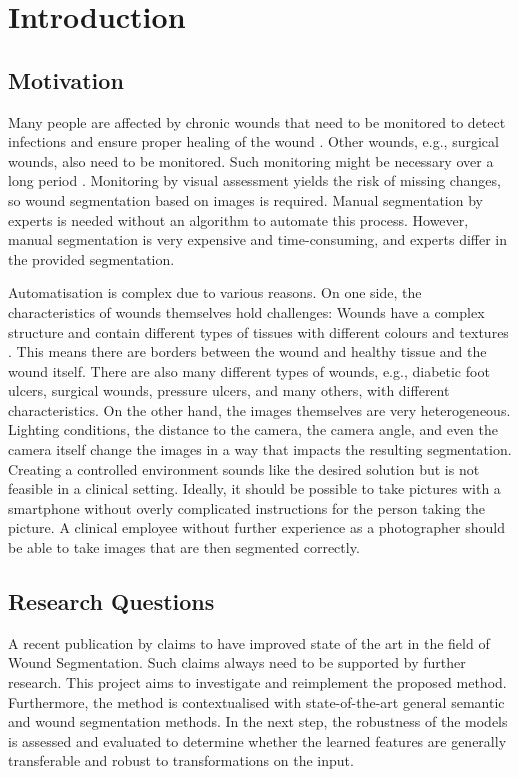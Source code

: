 \section{Introduction}

\subsection{Motivation}

Many people are affected by chronic wounds that need to be monitored to detect infections and ensure proper healing of the wound \cite{DFUC2022}. Other wounds, e.g., surgical wounds, also need to be monitored. Such monitoring might be necessary over a long period \cite{DFUC2022}. Monitoring by visual assessment yields the risk of missing changes, so wound segmentation based on images is required. Manual segmentation by experts is needed without an algorithm to automate this process. However, manual segmentation is very expensive and time-consuming, and experts differ in the provided segmentation.

Automatisation is complex due to various reasons. On one side, the characteristics of wounds themselves hold challenges: Wounds have a complex structure and contain different types of tissues with different colours and textures \cite{AhmadFauzi2015}. This means there are borders between the wound and healthy tissue and the wound itself. There are also many different types of wounds, e.g., diabetic foot ulcers, surgical wounds, pressure ulcers, and many others, with different characteristics. On the other hand, the images themselves are very heterogeneous. Lighting conditions, the distance to the camera, the camera angle, and even the camera itself change the images in a way that impacts the resulting segmentation. Creating a controlled environment sounds like the desired solution but is not feasible in a clinical setting. Ideally, it should be possible to take pictures with a smartphone without overly complicated instructions for the person taking the picture. A clinical employee without further experience as a photographer should be able to take images that are then segmented correctly.

\subsection{Research Questions}

A recent publication by \citeauthor{Oota_2023_WACV} claims to have improved state of the art in the field of Wound Segmentation. Such claims always need to be supported by further research. This project aims to investigate and reimplement the proposed method. Furthermore, the method is contextualised with state-of-the-art general semantic and wound segmentation methods. In the next step, the robustness of the models is assessed and evaluated to determine whether the learned features are generally transferable and robust to transformations on the input.

